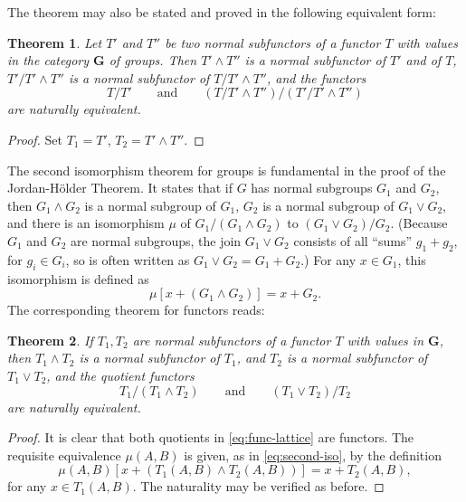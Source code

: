\documentclass[11pt,a4paper]{report}
\newtheorem{theorem}{Theorem}
\begin{document}
The theorem may also be stated and proved in the following equivalent form:
\begin{theorem}
	Let $T'$ and $T''$ be two normal subfunctors of a functor $T$ with values in the category $\mathbf{G}$ of groups.
	Then $T'\wedge T''$ is a normal subfunctor of $T'$ and of $T$, $T'/T'\wedge T''$ is a normal subfunctor of
	$T/T'\wedge T''$, and the functors
	\begin{equation}\label{eq:grp-lattice}
		T/T'\qquad \text{and}\qquad (T/T'\wedge T'')/(T'/T'\wedge T'')
	\end{equation}
	are naturally equivalent.
\end{theorem}
\begin{proof}
	Set $T_1=T'$, $T_2=T'\wedge T''$.
\end{proof}

The second isomorphism theorem for groups is fundamental in the proof of the Jordan\hyp{}H{\"o}lder Theorem. It states
that if $G$ has normal subgroups $G_1$ and $G_2$, then $G_1\wedge G_2$ is a normal subgroup of $G_1$, $G_2$ is a normal 
subgroup of $G_1\vee G_2$, and there is an isomorphism $\mu$ of $G_1/(G_1\wedge G_2)$ to $(G_1\vee G_2)/G_2$. (Because
$G_1$ and $G_2$ are normal subgroups, the join $G_1\vee G_2$ consists of all ``sums'' $g_1+g_2$, for $g_i\in G_i$, so
is often written as $G_1\vee G_2= G_1+G_2$.) For any $x\in G_1$, this isomorphism is defined as
\begin{equation}\label{eq:second-iso}
	\mu[x+(G_1\wedge G_2)]= x + G_2.
\end{equation}
The corresponding theorem for functors reads:
\begin{theorem}
	If $T_1,T_2$ are normal subfunctors of a functor $T$ with values in $\mathbf{G}$, then $T_1\wedge T_2$ is a normal
	subfunctor of $T_1$, and $T_2$ is a normal subfunctor of $T_1\vee T_2$, and the quotient functors
	\begin{equation}\label{eq:func-lattice}
		T_1/(T_1\wedge T_2)\qquad\text{and}\qquad (T_1\vee T_2)/T_2
	\end{equation}
	are naturally equivalent.
\end{theorem}
\begin{proof}
	It is clear that both quotients in \cref{eq:func-lattice} are functors. The requisite equivalence $\mu(A,B)$ is given,
	as in \cref{eq:second-iso}, by  the definition
	\begin{equation*}
		\mu(A,B)[x+(T_1(A,B)\wedge T_2(A,B))] = x + T_2(A,B),
	\end{equation*}
	for any $x\in T_1(A,B)$. The naturality may be verified as before.
\end{proof}
\end{document}
